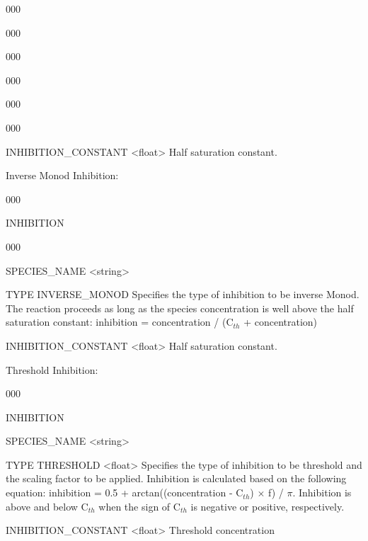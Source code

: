 \begin{deflist}{000}
\begin{deflist}{000}
\begin{deflist}{000}
\begin{deflist}{000}
\begin{deflist}{000}
\begin{deflist}{000}
        \item [INHIBITION\_CONSTANT] <float> Half saturation constant.
      \end{deflist}
    \end{deflist}
 
    \item [Inverse Monod Inhibition:] ~

    \begin{deflist}{000}
      \item [INHIBITION] ~

      \begin{deflist}{000}
         \item [SPECIES\_NAME] <string>

         \item [TYPE INVERSE\_MONOD] Specifies the type of inhibition to be inverse Monod. The reaction proceeds as long as the species concentration is well above the half saturation constant: inhibition = concentration / (C$_{th}$ + concentration)

        \item [INHIBITION\_CONSTANT] <float> Half saturation constant.

      \end{deflist}
    \end{deflist}

\item [Threshold Inhibition:] ~ %
\begin{deflist}{000}
\item [INHIBITION] ~
\item [SPECIES\_NAME] <string>

\item [TYPE THRESHOLD] <float>
Specifies the type of inhibition to be threshold and the scaling factor to be applied. Inhibition is calculated based on the following equation: inhibition = 0.5 + arctan((concentration - C$_{th}$) $\times$ f) / $\pi$. Inhibition is above and below C$_{th}$ when the sign of C$_{th}$ is negative or positive, respectively.

\item [INHIBITION\_CONSTANT] <float> Threshold concentration
\end{deflist}
\end{deflist}
\end{deflist}
\item[\keyend]
\end{deflist}


\end{deflist}
